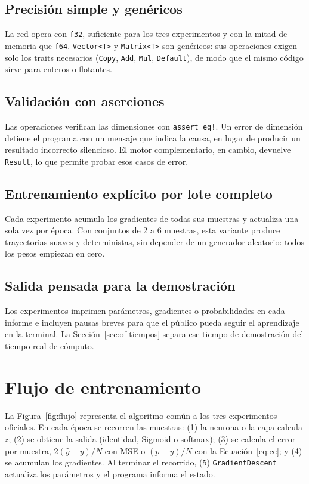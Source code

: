 \subsection{Precisión simple y genéricos}
La red opera con \texttt{f32}, suficiente para los tres experimentos y con la mitad de memoria que \texttt{f64}. \texttt{Vector<T>} y \texttt{Matrix<T>} son genéricos: sus operaciones exigen solo los traits necesarios (\texttt{Copy}, \texttt{Add}, \texttt{Mul}, \texttt{Default}), de modo que el mismo código sirve para enteros o flotantes.

\subsection{Validación con aserciones}
Las operaciones verifican las dimensiones con \texttt{assert\_eq!}. Un error de dimensión detiene el programa con un mensaje que indica la causa, en lugar de producir un resultado incorrecto silencioso. El motor complementario, en cambio, devuelve \texttt{Result}, lo que permite probar esos casos de error.

\subsection{Entrenamiento explícito por lote completo}
Cada experimento acumula los gradientes de todas sus muestras y actualiza una sola vez por época. Con conjuntos de 2 a 6 muestras, esta variante produce trayectorias suaves y deterministas, sin depender de un generador aleatorio: todos los pesos empiezan en cero.

\subsection{Salida pensada para la demostración}
Los experimentos imprimen parámetros, gradientes o probabilidades en cada informe e incluyen pausas breves para que el público pueda seguir el aprendizaje en la terminal. La Sección~\ref{sec:of-tiempos} separa ese tiempo de demostración del tiempo real de cómputo.

\section{Flujo de entrenamiento}
La Figura~\ref{fig:flujo} representa el algoritmo común a los tres experimentos oficiales. En cada época se recorren las muestras: (1) la neurona o la capa calcula $z$; (2) se obtiene la salida (identidad, Sigmoid o softmax); (3) se calcula el error por muestra, $2(\hat{y}-y)/N$ con MSE o $(p-y)/N$ con la Ecuación~\eqref{eq:ce}; y (4) se acumulan los gradientes. Al terminar el recorrido, (5) \texttt{GradientDescent} actualiza los parámetros y el programa informa el estado.

